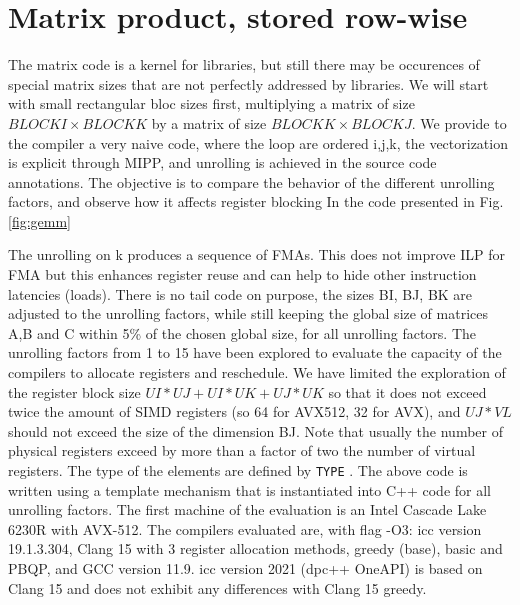 \documentclass{article}
\begin{document}
\section{Matrix product, stored row-wise}
The matrix code is a kernel for libraries, but still there may be occurences of special matrix sizes that are not perfectly addressed by libraries. We will start with small rectangular bloc sizes first, multiplying a matrix of size $BLOCKI\times BLOCKK$ by a matrix of size $BLOCKK \times BLOCKJ$. We provide to the compiler a very naive code, where the loop are ordered i,j,k, the vectorization is explicit through MIPP, and unrolling is achieved in the source code annotations. The objective is to compare the behavior of the different unrolling factors, and observe how it affects register blocking In the code presented in Fig.\ref{fig:gemm}

The unrolling on k
produces a sequence of FMAs. This does not improve ILP for FMA but
this enhances register reuse and can help to hide other instruction
latencies (loads).  There is no tail code on purpose, the sizes BI,
BJ, BK are adjusted to the unrolling factors, while still keeping the
global size of matrices A,B and C within 5\% of the chosen global
size, for all unrolling factors.  The unrolling factors from 1 to 15
have been explored to evaluate the capacity of the compilers to
allocate registers and reschedule. We have limited the exploration of
the register block size $UI*UJ+UI*UK+UJ*UK$ so that it does not exceed
twice the amount of SIMD registers (so 64 for AVX512, 32 for AVX), and
$UJ*VL$ should not exceed the size of the dimension BJ. Note that usually the number of physical registers exceed by more than a factor of two the number of virtual registers. The type of the elements are defined by \texttt{TYPE} . The above code
is written using a template mechanism that is instantiated
into C++ code for all unrolling factors.  The first machine of the
evaluation is an Intel Cascade Lake 6230R with AVX-512. The compilers
evaluated are, with flag -O3: icc version 19.1.3.304,  Clang 15 with 3 register allocation methods, greedy
(base), basic and PBQP, and GCC version 11.9. icc version 2021
(dpc++ OneAPI) is based on Clang 15 and does not exhibit any differences with Clang 15 greedy. 
\end{document}
